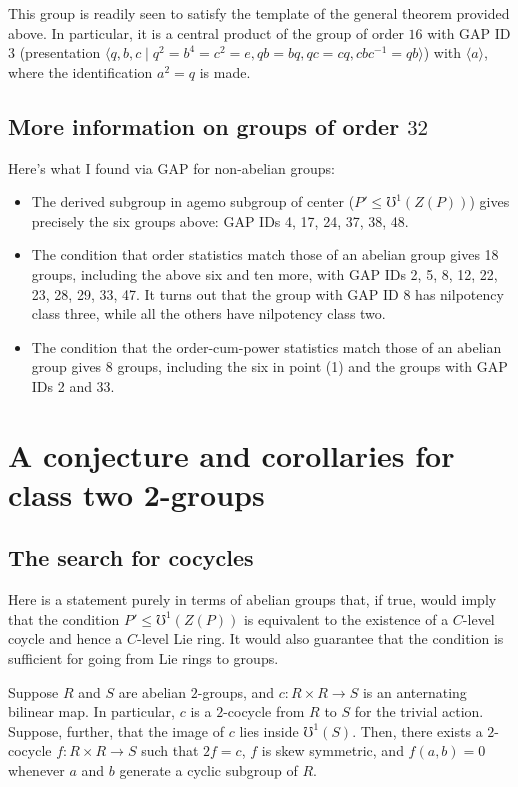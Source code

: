 \documentclass[10pt]{amsart}
\begin{document}
This group is readily seen to satisfy the template of the general
theorem provided above. In particular, it is a central product of the
group of order $16$ with GAP ID $3$ (presentation $\langle q,b,c \mid
q^2 = b^4 = c^2 = e, qb = bq, qc = cq, cbc^{-1} = qb \rangle$) with
$\langle a \rangle$, where the identification $a^2 = q$ is made.

\subsection{More information on groups of order $32$}

Here's what I found via GAP for non-abelian groups:

\begin{itemize}
\item The derived subgroup in agemo subgroup of center ($P' \le
  \mho^1(Z(P))$) gives precisely the six groups above: GAP IDs 4, 17, 24,
  37, 38, 48.
\item The condition that order statistics match those of an abelian
  group gives 18 groups, including the above six and ten more, with
  GAP IDs 2, 5, 8, 12, 22, 23, 28, 29, 33, 47. It turns out that the
  group with GAP ID 8 has nilpotency class three, while all the others
  have nilpotency class two.
\item The condition that the order-cum-power statistics match those of an
  abelian group gives 8 groups, including the six in point (1) and the
  groups with GAP IDs 2 and 33.
\end{itemize}

\section{A conjecture and corollaries for class two 2-groups}

\subsection{The search for cocycles}

Here is a statement purely in terms of abelian groups that, if true,
would imply that the condition $P' \le \mho^1(Z(P))$ is equivalent to
the existence of a $C$-level coycle and hence a $C$-level Lie ring. It
would also guarantee that the condition is sufficient for going from
Lie rings to groups.

\begin{conjecture}
  Suppose $R$ and $S$ are abelian $2$-groups, and $c:R \times R \to S$
  is an anternating bilinear map. In particular, $c$ is a $2$-cocycle
  from $R$ to $S$ for the trivial action. Suppose, further, that the
  image of $c$ lies inside $\mho^1(S)$. Then, there exists a
  $2$-cocycle $f:R \times R \to S$ such that $2f = c$, $f$ is skew
  symmetric, and $f(a,b) = 0$ whenever $a$ and $b$ generate a cyclic
  subgroup of $R$.
\end{conjecture}
\end{document}
